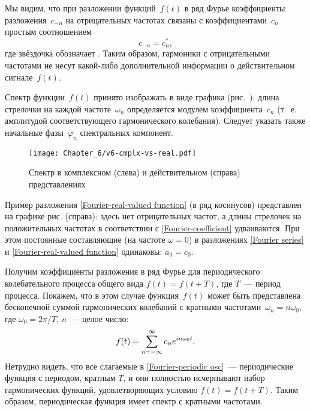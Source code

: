 Мы видим, что при разложении  функций~$f(t)$ в ряд Фурье
коэффициенты разложения~$c_{-n}$ на отрицательных
частотах связаны с коэффициентами~$c_n$ простым соотношением
\begin{equation*}
c_{-n}=c_{n}^*,
\end{equation*}
где звёздочка обозначает .
Таким образом, гармоники с отрицательными частотами не несут какой-либо
дополнительной информации о действительном сигнале~$f(t)$.

Спектр функции~$f(t)$ принято изображать в виде графика
(рис.~): длина стрелочки на каждой частоте~$\omega_n$
определяется модулем коэффициента~$c_n$ (т.~е. амплитудой соответствующего
гармонического колебания). Следует указать также начальные фазы~$\varphi_n$
спектральных компонент.

\begin{figure}[ht]
    \centering\texttt{[image: Chapter\_6/v6-cmplx-vs-real.pdf]}
    \caption{Спектр в комплексном (слева) и действительном (справа) представлениях}
\end{figure}

Пример разложения \eqref{Fourier-real-valued function} (в ряд
косинусов) представлен на графике рис.  (справа): здесь нет
отрицательных частот, а длины стрелочек на положительных частотах в соответствии с
\eqref{Fourier-coefficient} удваиваются. При этом постоянные составляющие
(на частоте $\omega=0$) в разложениях \eqref{Fourier series} и
\eqref{Fourier-real-valued function} одинаковы: $a_0=c_0$.

\label{sec:spectrum-periodic}
Получим коэффициенты разложения в ряд Фурье для периодического колебательного
процесса общего вида $f(t)=f(t+T)$, где $T$~--- период процесса.
Покажем, что в этом случае функция~$f(t)$ может быть представлена
бесконечной суммой гармонических колебаний с кратными частотами~$\omega_n=n\omega_0$,
где $\omega_0=2\pi/T$, $n$~--- целое число:
\begin{equation}
    \eqmark{Fourier-periodic osc}
    f(t)=\sum_{n=-\infty}^{\infty} c_n e^{in\omega_0 t}.
\end{equation}
Нетрудно видеть, что все слагаемые в \eqref{Fourier-periodic osc}~---
периодические функция с периодом, кратным $T$, и они полностью исчерпывают
набор гармонических функций, удовлетворяющих условию $f(t)=f(t+T)$.
Таким образом, периодическая функция имеет 
спектр с кратными частотами.

